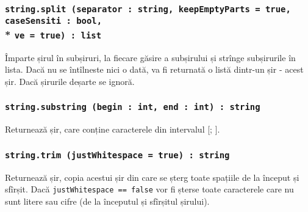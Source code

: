 \subsubsection{\lstinline|string.split (separator : string, keepEmptyParts = true, caseSensiti : bool,|\\* \lstinline|ve = true) : list|}

Împarte șirul în subșiruri, la fiecare găsire a subșirului  și strînge subșirurile în lista. Dacă  nu se întîlneste nici o dată, va fi returnată o listă dintr-un șir - acest șir. Dacă  șirurile deșarte se ignoră.

\subsubsection{\lstinline|string.substring (begin : int, end : int) : string|}

Returnează șir, care conține caracterele din intervalul [; ].

\subsubsection{\lstinline|string.trim (justWhitespace = true) : string|}

Returnează șir, copia acestui șir din care se șterg toate spațiile de la început și sfîrșit. Dacă \lstinline|justWhitespace == false| vor fi șterse toate caracterele care nu sunt litere sau cifre (de la începutul și sfîrșitul șirului).


